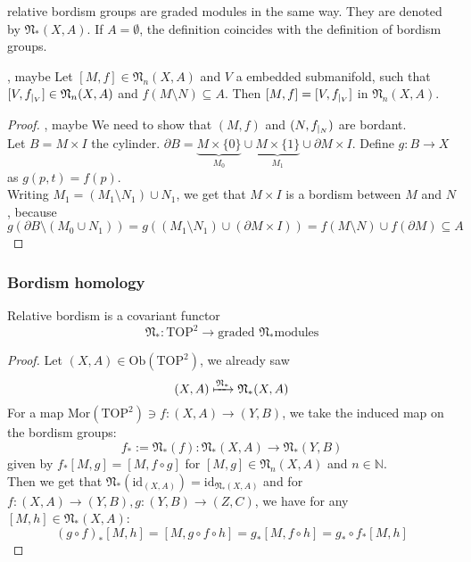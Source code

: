 \documentclass[a4paper,11pt]{article}
\begin{document}
relative bordism groups are graded modules in the same way. They are denoted by \(\mathfrak{N}_\ast(X,A)\).
If \(A=\emptyset\), the definition coincides with the definition of bordism groups.

\begin{lemma}\label{almost excision}\cite[Lemma 5.1]{zhang}, maybe \cite[21.1.8]{dieck}
    Let \([M,f]\in\mathfrak{N}_n(X,A)\) and \(V\) a embedded submanifold, such that \([V,f_{|_{V}}]\in\mathfrak{N}_n(X,A)\) and \(f(M\setminus N)\subseteq A\). Then \([M,f]=[V,f_{|_{V}}]\) in \(\mathfrak{N}_n(X,A)\).
\end{lemma}

\begin{proof}\cite{zhang}, maybe \cite{dieck}
    We need to show that \((M,f)\) and \((N,f_{|_{N}})\) are bordant.\\
    Let \(B=M\times I\) the cylinder. \(\partial B= \underbrace{M\times\{0\}}_{M_0}\cup \underbrace{M\times\{1\}}_{M_1}\cup \partial M\times I\). Define \(g:B\to X\) as \(g(p,t)=f(p)\).\\
    Writing \(M_1=(M_1\setminus N_1)\cup N_1\), we get that \(M\times I\) is a bordism between \(M\) and \(N\), because
    \[g(\partial B\setminus(M_0\cup N_1))=g((M_1\setminus N_1)\cup(\partial M\times I))=f(M\setminus N)\cup f(\partial M)\subseteq A\]
\end{proof}

\subsubsection{Bordism homology}

\begin{lemma}\cite[II, Satz 3.2]{brocker}\label{functoriality}
    Relative bordism is a covariant functor \[\mathfrak{N}_\ast:\mathrm{TOP}^2\to\text{graded \(\mathfrak{N}_\ast\)modules}\]
\end{lemma}

\begin{proof}\cite{brocker} 
    Let \((X,A)\in\mathrm{Ob}(\mathrm{TOP}^2)\), we already saw
    \[(X,A)\xmapsto{\mathfrak{N}_\ast}\mathfrak{N}_\ast(X,A)\]
    For a map \(\mathrm{Mor}(\mathrm{TOP}^2)\ni f:(X,A)\to(Y,B)\), we take the induced map on the bordism groups:
    \[f_\ast:=\mathfrak{N}_\ast(f):\mathfrak{N}_\ast(X,A)\to\mathfrak{N}_\ast(Y,B)\]
    given by \(f_\ast[M,g]=[M,f\circ g]\) for \([M,g]\in\mathfrak{N}_n(X,A)\) and \(n\in\mathbb{N}\).\\
    Then we get that \(\mathfrak{N}_\ast(\mathrm{id}_{(X,A)})=\mathrm{id}_{\mathfrak{N}_\ast(X,A)}\) and for \(f:(X,A)\to(Y,B), g:(Y,B)\to(Z,C)\), we have for any \([M,h]\in\mathfrak{N}_\ast(X,A)\):
    \[{(g\circ f)}_{\ast}[M,h]=[M,g\circ f\circ h]=g_\ast[M,f\circ h]=g_\ast\circ f_\ast[M,h]\]
\end{proof}
\end{document}
